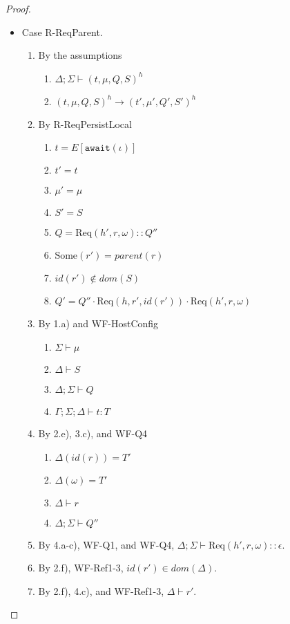 \documentclass{article}
\theoremstyle{definition}
\newcommand{\Req}[3]{\text{Req}(#1, #2, #3)}
\begin{document}
\begin{proof}
\begin{itemize}
\item Case R-ReqParent.
\begin{enumerate}
\item By the assumptions
  \begin{enumerate}[label=(\alph*)]
  \item $\Delta ; \Sigma \vdash (t, \mu, Q, S)^h$
  \item $(t, \mu, Q, S)^h \longrightarrow (t', \mu', Q', S')^h$
  \end{enumerate}
\item By R-ReqPersistLocal
  \begin{enumerate}[label=(\alph*)]
  \item $t = E[\texttt{await}(\iota)]$
  \item $t' = t$
  \item $\mu' = \mu$
  \item $S' = S$
  \item $Q = {\Req {h'} r \omega} :: Q''$  %
  \item $\text{Some}(r') = parent(r)$
  \item $id(r') \notin dom(S)$
  \item $Q' = Q'' \cdot {\Req h {r'} {id(r')}} \cdot {\Req {h'} r \omega}$
  \end{enumerate}
\item By 1.a) and WF-HostConfig
  \begin{enumerate}[label=(\alph*)]
  \item $\Sigma \vdash \mu$
  \item $\Delta \vdash S$
  \item $\Delta ; \Sigma \vdash Q$
  \item $\Gamma ; \Sigma ; \Delta \vdash t : T$
  \end{enumerate}
\item By 2.e), 3.c), and WF-Q4
  \begin{enumerate}[label=(\alph*)]
  \item $\Delta(id(r)) = T'$
  \item $\Delta(\omega) = T'$
  \item $\Delta \vdash r$
  \item $\Delta ; \Sigma \vdash Q''$
  \end{enumerate}
\item By 4.a-c), WF-Q1, and WF-Q4, $\Delta ; \Sigma \vdash {\Req {h'} r \omega} :: \epsilon$.
\item By 2.f), WF-Ref1-3, $id(r') \in dom(\Delta)$.
\item By 2.f), 4.c), and WF-Ref1-3, $\Delta \vdash r'$.

\end{enumerate}
\end{itemize}
\end{proof}
\end{document}
